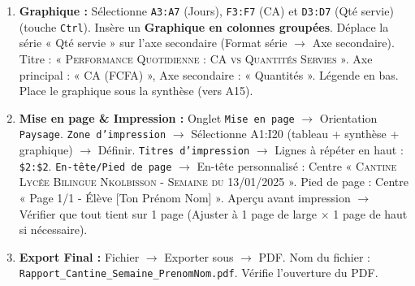 \documentclass[11pt]{article}
\begin{document}
\begin{enumerate}
\begin{itemize}
        \item Moyenne CA Jour : \texttt{MOYENNE(F3:F7)}.
        \item Max CA Jour : \texttt{MAX(F3:F7)}.
        \item Nb Jours Rupture : \texttt{NB.SI(H3:H7; "Rupture stock")}.
    \end{itemize}
    Applique le format FCFA aux montants.
    \item \textbf{Graphique :} Sélectionne \texttt{A3:A7} (Jours), \texttt{F3:F7} (CA) et \texttt{D3:D7} (Qté servie) (touche \texttt{Ctrl}). Insère un \textbf{Graphique en colonnes groupées}. Déplace la série « Qté servie » sur l'axe secondaire (Format série $\rightarrow$ Axe secondaire). Titre : « \textsc{Performance Quotidienne : CA vs Quantités Servies} ». Axe principal : « CA (FCFA) », Axe secondaire : « Quantités ». Légende en bas. Place le graphique sous la synthèse (vers A15).
    \item \textbf{Mise en page \& Impression :} Onglet \texttt{Mise en page} $\rightarrow$ Orientation \texttt{Paysage}. \texttt{Zone d'impression} $\rightarrow$ Sélectionne A1:I20 (tableau + synthèse + graphique) $\rightarrow$ Définir. \texttt{Titres d'impression} $\rightarrow$ Lignes à répéter en haut : \texttt{\$2:\$2}. \texttt{En-tête/Pied de page} $\rightarrow$ En-tête personnalisé : Centre « \textsc{Cantine Lycée Bilingue Nkolbisson - Semaine du 13/01/2025} ». Pied de page : Centre « Page 1/1 - Élève [Ton Prénom Nom] ». Aperçu avant impression $\rightarrow$ Vérifier que tout tient sur 1 page (Ajuster à 1 page de large $\times$ 1 page de haut si nécessaire).
    \item \textbf{Export Final :} Fichier $\rightarrow$ Exporter sous $\rightarrow$ PDF. Nom du fichier : \texttt{Rapport\_Cantine\_Semaine\_PrenomNom.pdf}. Vérifie l'ouverture du PDF.
\end{enumerate}
\end{document}
